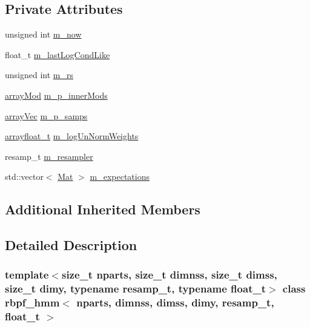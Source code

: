 \subsection*{Private Attributes}
\begin{DoxyCompactItemize}
\item 
unsigned int \hyperlink{classrbpf__hmm_a1405e1f6ce133cf4d0089bb9cc875d0e}{m\+\_\+now}
\item 
float\+\_\+t \hyperlink{classrbpf__hmm_a8b08a5af7f7ef6b0079c69ff0c6b485f}{m\+\_\+last\+Log\+Cond\+Like}
\item 
unsigned int \hyperlink{classrbpf__hmm_ae4f15e5a4f31eefa789fbffd86e78a6b}{m\+\_\+rs}
\item 
\hyperlink{classrbpf__hmm_a6dad2eb9cecbc6a85e348fec442c2998}{array\+Mod} \hyperlink{classrbpf__hmm_a37251f098a509b771e20eae32d779f9d}{m\+\_\+p\+\_\+inner\+Mods}
\item 
\hyperlink{classrbpf__hmm_a2154906d47b4eb987fe7c238d1aace0a}{array\+Vec} \hyperlink{classrbpf__hmm_a6caeb30aae73ee88f4131103dbf1f84b}{m\+\_\+p\+\_\+samps}
\item 
\hyperlink{classrbpf__hmm_aae4e776097278c6e5c25f614d7cad7bd}{arrayfloat\+\_\+t} \hyperlink{classrbpf__hmm_a6dc40d4e2fd23ce66be5473bdaf438a5}{m\+\_\+log\+Un\+Norm\+Weights}
\item 
resamp\+\_\+t \hyperlink{classrbpf__hmm_ab298b91a0da6b09197915e337ca2b8a1}{m\+\_\+resampler}
\item 
std\+::vector$<$ \hyperlink{classrbpf__hmm_ac32aaf9833767d6886f732243a77aa66}{Mat} $>$ \hyperlink{classrbpf__hmm_aedb1b513e10d071735fb5d06295c664b}{m\+\_\+expectations}
\end{DoxyCompactItemize}
\subsection*{Additional Inherited Members}


\subsection{Detailed Description}
\subsubsection*{template$<$size\+\_\+t nparts, size\+\_\+t dimnss, size\+\_\+t dimss, size\+\_\+t dimy, typename resamp\+\_\+t, typename float\+\_\+t$>$\newline
class rbpf\+\_\+hmm$<$ nparts, dimnss, dimss, dimy, resamp\+\_\+t, float\+\_\+t $>$}

